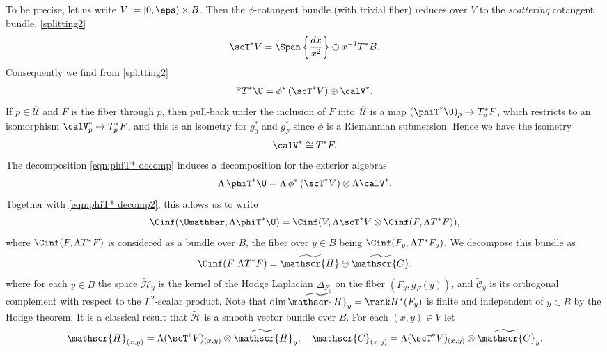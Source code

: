 To be precise, let us write $V:= [0,\eps)\times B$.
Then the $\phi$-cotangent bundle (with trivial fiber) reduces over $V$ to the
\emph{scattering} cotangent bundle, \cf \eqref{splitting2}
\begin{equation}
\label{eqn:phiT* decomp2}
\scT^*V = \Span \left\{ \frac{dx}{x^2}\right\} \oplus x^{-1} T^*B.
\end{equation}
Consequently we find from \eqref{splitting2}
\begin{equation}
\label{eqn:phiT* decomp}
{}^\phi T^*\U = \phi^* \left(\scT^*V\right) \oplus \calV^*.
\end{equation}
If $p\in \overline{\mathscr{U}}$ and $F$ is the fiber through $p$, then pull-back under the inclusion of $F$ into~$\overline{\mathscr{U}}$ is a map $(\phiT^*\U)_p\to T_p^*F$, which restricts to an isomorphism $\calV^*_p\to T^*_pF$, and this is an isometry for $g_0^*$ and $g_F^*$ since $\phi$ is a Riemannian submersion. Hence we have the isometry
\begin{equation} \label{eqn:V T*F identif}
\calV^* \cong T^*F.
\end{equation}
The decomposition \eqref{eqn:phiT* decomp} induces a decomposition
for the exterior algebras
\begin{equation}
\label{eqn:Lambda decomp}
\Lambda\,\phiT^*\U =
\Lambda \,\phi^*\left(\scT^*V\right) \otimes \Lambda \calV^*.
\end{equation}
Together with \eqref{eqn:phiT* decomp2}, this allows us to write
\[
\Cinf(\Umathbar,\Lambda \phiT^*\U) = \Cinf(V, \Lambda\scT^*V \otimes \Cinf(F,\Lambda T^*F)),
\]
where $\Cinf(F,\Lambda T^*F)$ is considered as a bundle over $B$, the fiber over $y\in B$ being $\Cinf(F_y,\Lambda T^*F_y)$.
We decompose this bundle as
\begin{equation}
\label{eqn:Cinf F decomp}
\Cinf(F,\Lambda T^*F) = \widetilde{\mathscr{H}}\oplus\widetilde{\mathscr{C}},
\end{equation}
where for each $y\in B$ the space $\widetilde{\mathscr{H}}_y$ is the kernel of the Hodge Laplacian $\Delta_{F_y}$ on the fiber $(F_y,g_F(y))$, and $\widetilde{\mathscr{C}}_y$ is its orthogonal complement with respect to the $L^2$-scalar product. Note that $\dim\widetilde{\mathscr{H}}_y=\rank H^*(F_y)$ is finite and independent of $y \in B$ by the Hodge theorem.
It is a classical result \cite[Cor.\,9.11]{heatdirac} that $\widetilde{\mathscr{H}}$ is a smooth vector bundle over $B$.
For each $(x,y)\in V$ let
\[
\mathscr{H}_{(x,y)} = \Lambda(\scT^* V)_{(x,y)}\otimes\widetilde{\mathscr{H}}_y,
\quad \mathscr{C}_{(x,y)}= \Lambda(\scT^* V)_{(x,y)}\otimes\widetilde{\mathscr{C}}_y.
\]
